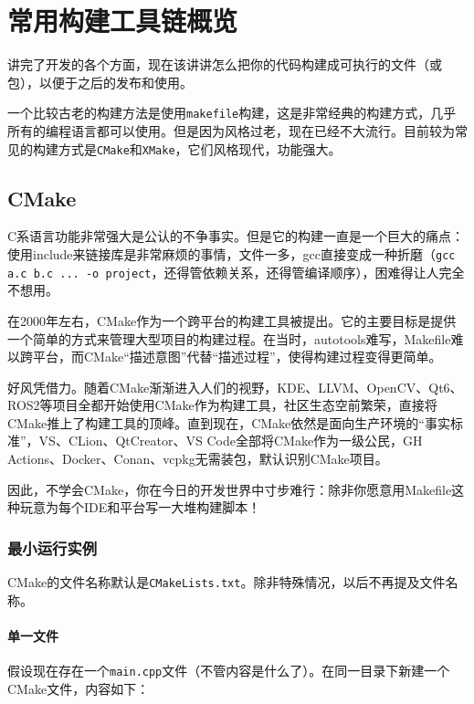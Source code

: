 \documentclass[../main.tex]{subfiles}
\begin{document}
\chapter{常用构建工具链概览}

讲完了开发的各个方面，现在该讲讲怎么把你的代码构建成可执行的文件（或包），以便于之后的发布和使用。

一个比较古老的构建方法是使用\texttt{makefile}构建，这是非常经典的构建方式，几乎所有的编程语言都可以使用。但是因为风格过老，现在已经不大流行。目前较为常见的构建方式是\texttt{CMake}和\texttt{XMake}，它们风格现代，功能强大。

\section{CMake}

C系语言功能非常强大是公认的不争事实。但是它的构建一直是一个巨大的痛点：使用include来链接库是非常麻烦的事情，文件一多，gcc直接变成一种折磨（\texttt{gcc a.c b.c ... -o project}，还得管依赖关系，还得管编译顺序），困难得让人完全不想用。

在2000年左右，CMake作为一个跨平台的构建工具被提出。它的主要目标是提供一个简单的方式来管理大型项目的构建过程。在当时，autotools难写，Makefile难以跨平台，而CMake“描述意图”代替“描述过程”，使得构建过程变得更简单。

好风凭借力。随着CMake渐渐进入人们的视野，KDE、LLVM、OpenCV、Qt6、ROS2等项目全都开始使用CMake作为构建工具，社区生态空前繁荣，直接将CMake推上了构建工具的顶峰。直到现在，CMake依然是面向生产环境的“事实标准”，VS、CLion、QtCreator、VS Code全部将CMake作为一级公民，GH Actions、Docker、Conan、vcpkg无需装包，默认识别CMake项目。

因此，不学会CMake，你在今日的开发世界中寸步难行：除非你愿意用Makefile这种玩意为每个IDE和平台写一大堆构建脚本！

\subsection{最小运行实例}

CMake的文件名称默认是\texttt{CMakeLists.txt}。除非特殊情况，以后不再提及文件名称。

\subsubsection{单一文件}

假设现在存在一个\texttt{main.cpp}文件（不管内容是什么了）。在同一目录下新建一个CMake文件，内容如下：
\end{document}
